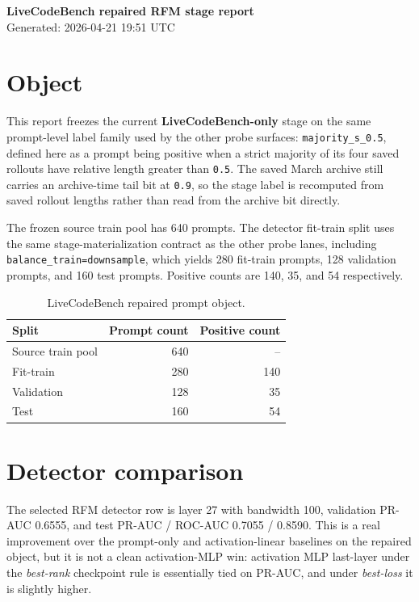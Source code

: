 \documentclass[11pt]{article}
\begin{document}
{\Large \textbf{LiveCodeBench repaired RFM stage report}}\\
Generated: 2026-04-21 19:51 UTC

\section*{Object}
This report freezes the current \textbf{LiveCodeBench-only} stage on the same prompt-level label family used by the other probe surfaces: \texttt{majority\_s\_0.5}, defined here as a prompt being positive when a strict majority of its four saved rollouts have relative length greater than \texttt{0.5}. The saved March archive still carries an archive-time tail bit at \texttt{0.9}, so the stage label is recomputed from saved rollout lengths rather than read from the archive bit directly.

The frozen source train pool has 640 prompts. The detector fit-train split uses the same stage-materialization contract as the other probe lanes, including \texttt{balance\_train=downsample}, which yields 280 fit-train prompts, 128 validation prompts, and 160 test prompts. Positive counts are 140, 35, and 54 respectively.

\begin{table}[H]
\centering
\begin{tabular}{lrr}
\toprule
Split & Prompt count & Positive count \\
\midrule
Source train pool & 640 & -- \\
Fit-train & 280 & 140 \\
Validation & 128 & 35 \\
Test & 160 & 54 \\
\bottomrule
\end{tabular}
\caption{LiveCodeBench repaired prompt object.}
\end{table}

\section*{Detector comparison}
The selected RFM detector row is layer 27 with bandwidth 100, validation PR-AUC 0.6555, and test PR-AUC / ROC-AUC 0.7055 / 0.8590. This is a real improvement over the prompt-only and activation-linear baselines on the repaired object, but it is not a clean activation-MLP win: activation MLP last-layer under the \emph{best-rank} checkpoint rule is essentially tied on PR-AUC, and under \emph{best-loss} it is slightly higher.
\end{document}
